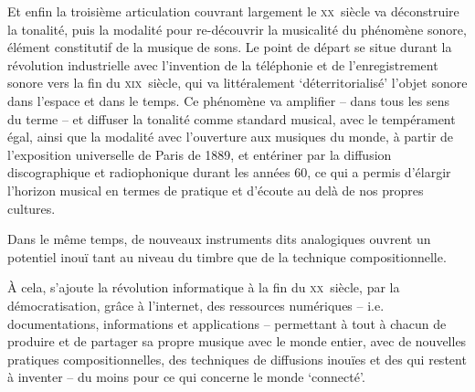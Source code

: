 \documentclass{article}
\begin{document}
Et enfin la troisième articulation couvrant largement le \textsc{xx}\ieme ~siècle va déconstruire la tonalité, puis la modalité pour re-découvrir la musicalité du phénomène sonore, élément constitutif de la musique de sons. Le point de départ se situe durant la révolution industrielle avec l'invention de la téléphonie et de l'enregistrement sonore vers la fin du \textsc{xix}\ieme ~siècle, qui va littéralement `déterritorialisé' %
 l'objet sonore dans l'espace et dans le temps. Ce phénomène va amplifier -- dans tous les sens du terme -- et %
 diffuser la tonalité comme standard musical, avec le tempérament égal, ainsi que la modalité avec l’ouverture aux musiques du monde, %
 à partir de l’exposition universelle de Paris de 1889, et entériner par la diffusion discographique et radiophonique durant les années 60, ce qui a permis d’élargir l’horizon musical en termes de pratique et d’écoute au delà de nos propres cultures.%

Dans le même temps, de nouveaux instruments dits analogiques ouvrent un potentiel inouï tant au niveau du timbre que de la technique compositionnelle.

À cela, s'ajoute la révolution informatique à la fin du \textsc{xx}\ieme ~siècle,  par la démocratisation, grâce à l'internet, des ressources numériques -- i.e. documentations, informations et applications -- permettant à tout à chacun de produire et de partager sa propre musique avec le monde entier, avec de nouvelles pratiques compositionnelles, des techniques de diffusions inouïes et des qui restent à inventer -- du moins pour ce qui concerne le monde `connecté'.
\end{document}
